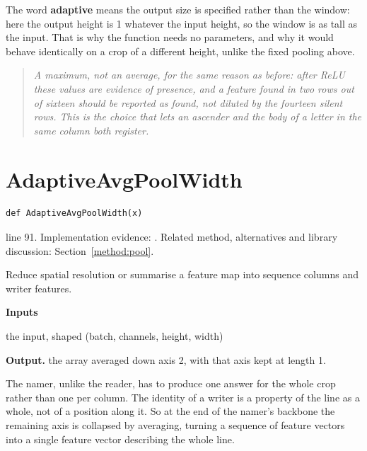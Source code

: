The word \textbf{adaptive} means the output size is specified rather than the window: here the output height is 1 whatever the input height, so the window is as tall as the input. That is why the function needs no parameters, and why it would behave identically on a crop of a different height, unlike the fixed pooling above.


\begin{quote}\small\itshape A maximum, not an average, for the same reason as before: after ReLU these values are evidence of presence, and a feature found in two rows out of sixteen should be reported as found, not diluted by the fourteen silent rows. This is the choice that lets an ascender and the body of a letter in the same column both register.\end{quote}


\section{AdaptiveAvgPoolWidth}\label{fn:recognise:AdaptiveAvgPoolWidth}
\begin{lstlisting}[style=sig]
def AdaptiveAvgPoolWidth(x)
\end{lstlisting}
 line 91. Implementation evidence: \cite{code2026}. Related method, alternatives and library discussion: Section~\ref{method:pool}.


Reduce spatial resolution or summarise a feature map into sequence columns and writer features.




\noindent\textbf{Inputs}
\begin{description}[leftmargin=2.2em,style=nextline,font=\normalfont\ttfamily]\setlength\itemsep{1pt}
  \item[{x}] \normalfont the input, shaped (batch, channels, height, width)
\end{description}

\noindent\textbf{Output.} the array averaged down axis 2, with that axis kept at length 1.


The namer, unlike the reader, has to produce one answer for the whole crop rather than one per column. The identity of a writer is a property of the line as a whole, not of a position along it. So at the end of the namer's backbone the remaining axis is collapsed by averaging, turning a sequence of feature vectors into a single feature vector describing the whole line.


